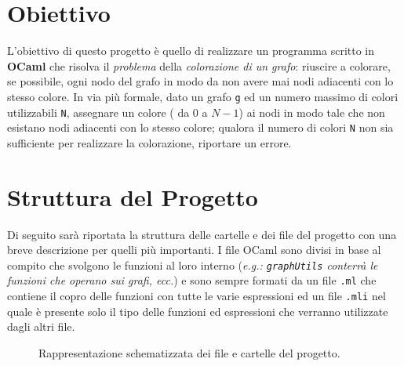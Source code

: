 \section{Obiettivo}
L'obiettivo di questo progetto è quello di realizzare un programma scritto in \textbf{OCaml} che risolva il \textit{problema} della \textit{colorazione di un grafo}: riuscire a colorare, se possibile, ogni nodo del grafo in modo da non avere mai nodi adiacenti con lo stesso colore. In via più formale, dato un grafo \lstinline[style=cmd]|g| ed un numero massimo di colori utilizzabili \lstinline[style=cmd]|N|, assegnare un colore ( da $0$ a $N-1$) ai nodi in modo tale che non esistano nodi adiacenti con lo stesso colore; qualora il numero di colori \lstinline[style=cmd]|N| non sia sufficiente per realizzare la colorazione, riportare un errore.
 
\section{Struttura del Progetto}

Di seguito sarà riportata la struttura delle cartelle e dei file del progetto con una breve descrizione per quelli più importanti. I file OCaml sono divisi in base al compito che svolgono le funzioni al loro interno (\textit{e.g.: \lstinline[style=cmd]|graphUtils| conterrà le funzioni che operano sui grafi, ecc.}) e sono sempre formati da un file \lstinline[style=cmd]|.ml| che contiene il copro delle funzioni con tutte le varie espressioni ed un file \lstinline[style=cmd]|.mli| nel quale è presente solo il tipo delle funzioni ed espressioni che verranno utilizzate dagli altri file.

\begin{figure}[H]
	\caption{Rappresentazione schematizzata dei file e cartelle del progetto.}
\end{figure}


